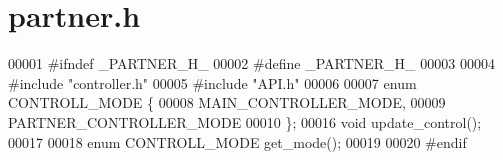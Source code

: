 \section{partner.\+h}
\label{partner_8h_source}

\begin{DoxyCode}
00001 \textcolor{preprocessor}{#ifndef \_PARTNER\_H\_}
00002 \textcolor{preprocessor}{#define  \_PARTNER\_H\_}
00003 
00004 \textcolor{preprocessor}{#include "controller.h"}
00005 \textcolor{preprocessor}{#include "API.h"}
00006 
00007 \textcolor{keyword}{enum} CONTROLL_MODE \{
00008   MAIN_CONTROLLER_MODE,
00009   PARTNER_CONTROLLER_MODE
00010 \};
00016 \textcolor{keywordtype}{void} update_control();
00017 
00018 \textcolor{keyword}{enum} CONTROLL_MODE get_mode();
00019 
00020 \textcolor{preprocessor}{#endif}
\end{DoxyCode}
